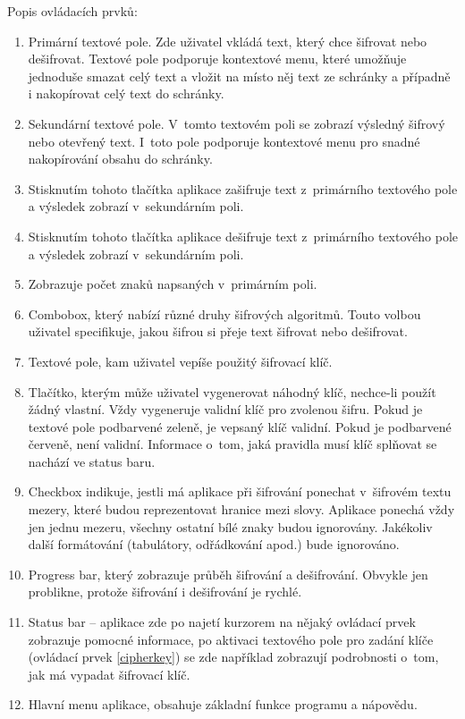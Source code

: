 \documentclass[12pt]{article}
\theoremstyle{definition}
\newcommand{\ovl}[1]{(ovládací prvek \ref{#1})}
\begin{document}
\newpage
Popis ovládacích prvků:

\begin{enumerate}
\item Primární textové pole. Zde uživatel vkládá text, který chce šifrovat nebo dešifrovat. Textové pole podporuje kontextové menu, které umožňuje jednoduše smazat celý text a vložit na místo něj text ze schránky a případně i nakopírovat celý text do schránky.
\item Sekundární textové pole. V~tomto textovém poli se zobrazí výsledný šifrový nebo otevřený text. I~toto pole podporuje kontextové menu pro snadné nakopírování obsahu do schránky. 
\item \label{encryptbutton} Stisknutím tohoto tlačítka aplikace zašifruje text z~primárního textového pole a výsledek zobrazí v~sekundárním poli.
\item \label{decryptbutton} Stisknutím tohoto tlačítka aplikace dešifruje text z~primárního textového pole a výsledek zobrazí v~sekundárním poli. 
\item Zobrazuje počet znaků napsaných v~primárním poli. 
\item \label{ciphers} Combobox, který nabízí různé druhy šifrových algoritmů. Touto volbou uživatel specifikuje, jakou šifrou si přeje text šifrovat nebo dešifrovat. 
\item \label{cipherkey} Textové pole, kam uživatel vepíše použitý šifrovací klíč. 
\item \label{randomkey} Tlačítko, kterým může uživatel vygenerovat náhodný klíč, nechce-li použít žádný vlastní. Vždy vygeneruje validní klíč pro zvolenou šifru. Pokud je textové pole podbarvené zeleně, je vepsaný klíč validní. Pokud je podbarvené červeně, není validní. Informace o~tom, jaká pravidla musí klíč splňovat se nachází ve status baru. 
\item Checkbox indikuje, jestli má aplikace při šifrování ponechat v~šifrovém textu mezery, které budou reprezentovat hranice mezi slovy. Aplikace ponechá vždy jen jednu mezeru, všechny ostatní bílé znaky budou ignorovány. Jakékoliv další formátování (tabulátory, odřádkování apod.) bude ignorováno.  
\item Progress bar, který zobrazuje průběh šifrování a dešifrování. Obvykle jen problikne, protože šifrování i dešifrování je rychlé. 
\item Status bar -- aplikace zde po najetí kurzorem na nějaký ovládací prvek zobrazuje pomocné informace, po aktivaci textového pole pro zadání klíče \ovl{cipherkey} se zde například zobrazují podrobnosti o~tom, jak má vypadat šifrovací klíč. 
\item Hlavní menu aplikace, obsahuje základní funkce programu a nápovědu. 
\end{enumerate}
\end{document}
